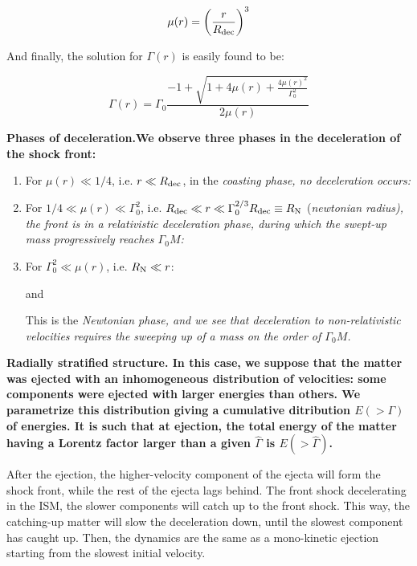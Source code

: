 $$\mu(r) = \left( \frac{r}{R_{\rm{dec}}} \right)^3 $$

And finally, the solution for $\Gamma(r)$ is easily found to be:

$$\Gamma(r) = \Gamma_0 \frac{-1 + \sqrt{1 + 4\mu(r) + \frac{4\mu(r) ^ 2}{\Gamma_0^2}}}{2 \mu(r)}$$

\bf{Phases of deceleration.}We observe three phases in the deceleration of the shock front:

\begin{enumerate}
	\item For $\mu(r) \ll 1/4$, i.e. $r \ll R_{\rm{dec}}$, in the \it{coasting phase}, no deceleration occurs:


	\item For $1/4 \ll \mu(r) \ll \Gamma_0 ^ 2$, i.e. $R_{\rm{dec}} \ll r \ll \Gamma_0^{2/3} R_{\rm{dec}} \equiv R_{\rm{N}}$ (\it{newtonian radius}), the front is in a \it{relativistic deceleration phase}, during which the swept-up mass progressively reaches $\Gamma_0 M$:



	\item For $\Gamma_0^2 \ll \mu(r)$, i.e. $ R_{\rm{N}} \ll r$:


	and


	This is the \it{Newtonian phase}, and we see that deceleration to non-relativistic velocities requires the sweeping up of a mass on the order of $\Gamma_0 M$.
\end{enumerate}

\bf{Radially stratified structure.} In this case, we suppose that the matter was ejected with an inhomogeneous distribution of velocities: some components were ejected with larger energies than others. We parametrize this distribution giving a cumulative ditribution $E( > \Gamma)$ of energies. It is such that at ejection, the total energy of the matter having a Lorentz factor larger than a given $\hat{\Gamma}$ is $E( > \hat{\Gamma})$.

After the ejection, the higher-velocity component of the ejecta will form the shock front, while the rest of the ejecta lags behind. The front shock decelerating in the ISM, the slower components will catch up to the front shock. This way, the catching-up matter will slow the deceleration down, until the slowest component has caught up. Then, the dynamics are the same as a mono-kinetic ejection starting from the slowest initial velocity.


